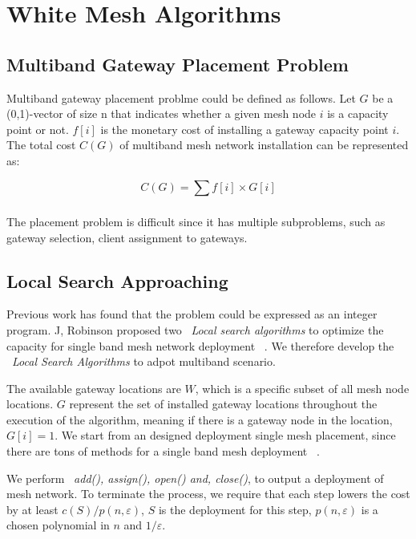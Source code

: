 \section{White Mesh Algorithms}
\label{sec:algorithms}

\subsection{Multiband Gateway Placement Problem}
\label{subsec:placementproblem}

Multiband gateway placement problme could be defined as follows. Let $G$ be a (0,1)-vector of size n that indicates whether a given mesh node $i$ is a capacity point or not. $f[i]$ is the monetary cost of installing a gateway capacity point $i$.
The total cost $C(G)$ of multiband mesh network installation can be represented as:

\begin{equation}
C(G)=\sum_{} f[i] \times G[i]
\end{equation}

The placement problem is difficult since it has multiple subproblems, such as gateway selection, client assignment to gateways. 

\subsection{Local Search Approaching}
Previous work has found that the problem could be expressed as an integer program. J, Robinson proposed two ~\emph{Local search algorithms} to optimize the capacity for single band mesh network deployment ~\cite{robinson2008adding}.
We therefore develop the ~\emph{Local Search Algorithms} to adpot multiband scenario.


The available gateway locations are $W$, which is a specific subset of all mesh node locations. $G$ represent the set of installed gateway locations throughout the execution of the algorithm, meaning if there is a gateway node in the location, $G[i]=1$.
We start from an designed deployment single mesh placement, since there are tons of methods for a single band mesh deployment ~\cite{akyildiz2005wireless}.

We perform ~\emph{add(), assign(), open() and, close()}, to output a deployment of mesh network. 
To terminate the process, we require that each step lowers the cost by at least $c(S)/p(n,\varepsilon)$, $S$ is the deployment for this step, $p(n,\varepsilon)$ is a chosen polynomial in $n$ and $1/ \varepsilon$.

